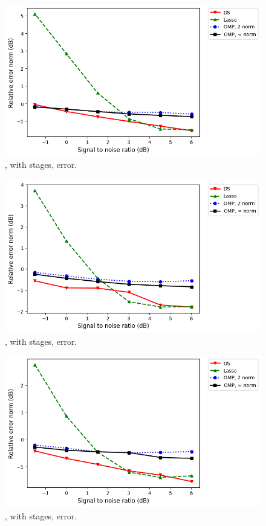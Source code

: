 %
\begin {figure} [H]
\includegraphics [width = \textwidth] {error-medium-more-tall-six-usual.png}
\caption {, with  stages, error.}
\end {figure}
%
\begin {figure} [H]
\includegraphics [width = \textwidth] {error-small-more-square-six-usual.png}
\caption {, with  stages, error.}
\end {figure}
%
\begin {figure} [H]
\includegraphics [width = \textwidth] {error-small-more-wide-six-usual.png}
\caption {, with  stages, error.}
\end {figure}
